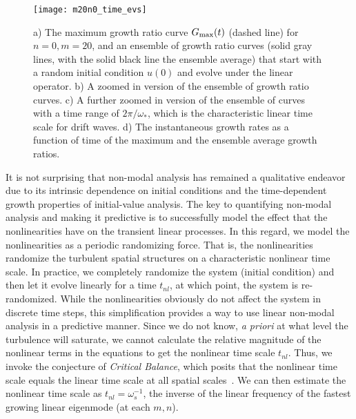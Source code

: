 \documentclass[showpacs,preprintnumbers,amsmath,amssymb,superscriptaddress,aip]{revtex4-1}
\begin{document}
\begin{figure}
\centerline{\texttt{[image: m20n0\_time\_evs]}}
\caption{a) The maximum growth ratio curve $G_{\rm{max}}(t)$ (dashed line) for $n=0,m=20$, and an ensemble of growth ratio curves (solid gray lines, with the solid black line the ensemble average)
that start with a random initial condition $u(0)$ and evolve under the linear operator. b) A zoomed in version of the ensemble of growth ratio curves. c) A further zoomed in version of the ensemble of
curves with a time range of $2 \pi / \omega_*$, which is the characteristic linear time scale for drift waves. d) The instantaneous growth rates as a function of time of the maximum and the ensemble 
average growth ratios.}
\label{m20n0_time_evs}
\end{figure}

It is not surprising that non-modal analysis has remained a qualitative endeavor due to its intrinsic dependence on initial conditions and the time-dependent growth properties of initial-value analysis.
The key to quantifying non-modal analysis and making it predictive is to successfully model the effect that the nonlinearities have on the transient linear processes.
In this regard, we model the nonlinearities as a periodic randomizing force. That is, the nonlinearities randomize the turbulent spatial structures on a characteristic nonlinear time scale. 
In practice, we completely randomize the system (initial condition) and then let it evolve linearly for a time $t_{nl}$, at which point, the system is re-randomized.
While the nonlinearities obviously do not affect the system in discrete time steps, this simplification provides a way to use linear non-modal analysis in a predictive manner. 
Since we do not know, \emph{a priori} at what level the turbulence will saturate, 
we cannot calculate the relative magnitude of the nonlinear terms in the equations to get the nonlinear time scale $t_{nl}$.
Thus, we invoke the conjecture of \emph{Critical Balance}, which posits that the nonlinear time scale equals the linear time scale at all spatial scales~\cite{schekochihin2012}. 
We can then estimate the nonlinear time scale as $t_{nl} = \omega_s^{-1}$, the inverse of the linear frequency of the fastest growing linear eigenmode (at each $m,n$).
\end{document}
